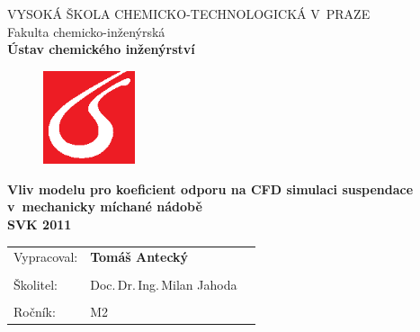 \begin{center}
{\Large VYSOKÁ ŠKOLA CHEMICKO-TECHNOLOGICKÁ V~PRAZE\\}
{\large Fakulta chemicko-inženýrská\\
\textbf{Ústav chemického inženýrství}\\}
\vspace{15mm}

\begin{figure}[!h]
\begin{center}
\includegraphics[angle=0,width=27mm]{images/logo_vscht.eps}
\end{center}
\end{figure}

\vspace{25mm}

{\LARGE \textbf{Vliv modelu pro koeficient odporu na CFD simulaci suspendace v~mechanicky míchané nádobě\\}}
\vspace{10mm}
{\Large \textbf{SVK 2011\\}}
\end{center}
\vspace{35mm}

\null
\vfill

\begin{tabular}{p{30mm}lp{50mm}}
Vypracoval: & \textbf{Tomáš Antecký}\\
\\
Školitel: & Doc.\,Dr.\,Ing.\,Milan Jahoda \\
\\
Ročník: & M2 \\


\end{tabular}
